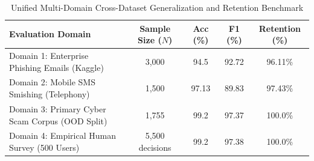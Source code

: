 \begin{table}[htbp]
\centering
\caption{Unified Multi-Domain Cross-Dataset Generalization and Retention Benchmark}
\label{tab:cross_dataset_transfer}
\begin{tabular}{lcccc}
\toprule
\textbf{Evaluation Domain} & \textbf{Sample Size ($N$)} & \textbf{Acc (\%)} & \textbf{F1 (\%)} & \textbf{Retention (\%)} \\
\midrule
Domain 1: Enterprise Phishing Emails (Kaggle) & 3,000 & 94.5 & 92.72 & 96.11\% \\
Domain 2: Mobile SMS Smishing (Telephony) & 1,500 & 97.13 & 89.83 & 97.43\% \\
Domain 3: Primary Cyber Scam Corpus (OOD Split) & 1,755 & 99.2 & 97.37 & 100.0\% \\
Domain 4: Empirical Human Survey (500 Users) & 5,500 decisions & 99.2 & 97.38 & 100.0\% \\
\bottomrule
\end{tabular}
\end{table}
